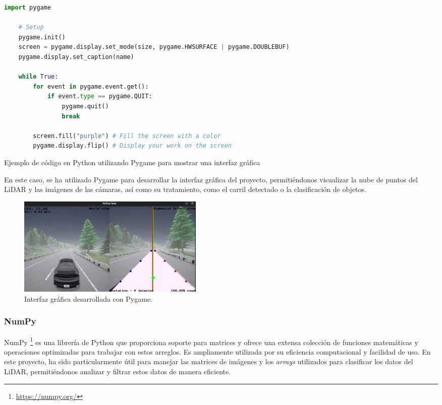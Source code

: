 \begin{code}[h]
\begin{lstlisting}[language=Python]
	 import pygame
	
	# Setup
	pygame.init()
	screen = pygame.display.set_mode(size, pygame.HWSURFACE | pygame.DOUBLEBUF)
	pygame.display.set_caption(name)

	while True:
	    for event in pygame.event.get():
	        if event.type == pygame.QUIT:
	            pygame.quit()
	            break

	    screen.fill("purple") # Fill the screen with a color
	    pygame.display.flip() # Display your work on the screen

\end{lstlisting}
\caption[Ejemplo de código en Python utilizando Pygame]{Ejemplo de código en Python utilizando Pygame para mostrar una interfaz gráfica}
\label{cod:pygame}
\end{code}

 En este caso, se ha utilizado Pygame para desarrollar la interfaz gráfica del proyecto, permitiéndonos visualizar la nube de puntos del \ac{LiDAR} y las imágenes de las cámaras, así como su tratamiento, como el carril detectado o la clasificación de objetos.

\begin{figure}[ht]
  \begin{center}
    \includegraphics[width=9cm]{figs/Plataformas_Desarollo/pygame.png}
  \end{center}
  \caption{Interfaz gráfica desarrollada con Pygame.}
  \label{foto_pygame}
\end{figure}

\subsubsection{NumPy}
\label{sec:numpy}

NumPy \footnote{\url{https://numpy.org/}} es una librería de Python que proporciona soporte para matrices y ofrece una extensa colección de funciones matemáticas y operaciones optimizadas para trabajar con estos arreglos. Es ampliamente utilizada por su eficiencia computacional y facilidad de uso. En este proyecto, ha sido particularmente útil para manejar las matrices de imágenes y los \textit{arrays} utilizados para clasificar los datos del \ac{LiDAR}, permitiéndonos analizar y filtrar estos datos de manera eficiente.


